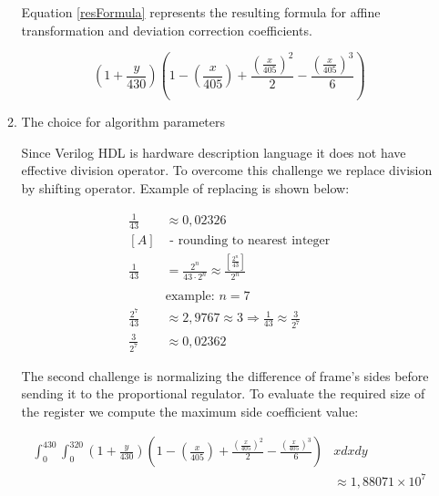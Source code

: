 \documentclass[a4paper,12pt]{article} %
\begin{document}
\begin{enumerate}
\begin{enumerate}
		Equation \eqref{resFormula} represents the resulting formula for affine transformation and deviation correction coefficients.

		\begin{equation}
			\left ( 1 + \frac{y}{430}\right )
			\left (  
			1 - \left ( \frac{x}{405}\right) + 
			\frac{\left ( \frac{x}{405}\right) ^2}{2}  -
			\frac{\left ( \frac{x}{405}\right)^3}{6}
			\right )
			\label{resFormula}
		\end{equation}
		\vspace{1cm}
		
		\item The choice for algorithm parameters
		
		Since Verilog HDL is hardware description language it does not have effective division operator. To overcome this challenge we replace division by shifting operator. Example of replacing is shown below:
		
 
		
		\begin{align*}
			\frac{1}{43} &\approx 0,02326 \\
			[A] &\text{ - rounding to nearest integer} \\
			\frac{1}{43} &= \frac{2^n}{43 \cdot 2^n} \approx \frac{\left [ \frac{2^n}{43} \right ]}{2^n} \\  \\
			&\text{example: } n = 7\\
			\frac{2^7}{43} &\approx 2,9767 \approx 3 \Rightarrow 
			\frac{1}{43} \approx \frac{3}{2^7} \\
			\frac{3}{2^7} &\approx 0,02362
		\end{align*}
		
		The second challenge is normalizing the difference of frame's sides before sending it to the proportional regulator. To evaluate the required size of the register we compute the maximum side coefficient value:
		
		
		\begin{equation}
		\begin{aligned}
			\int_0^{430} \int_0^{320} 
			\left ( 1 + \frac{y}{430}\right )
			\left (  
			1 - \left ( \frac{x}{405}\right) + 
			\frac{\left ( \frac{x}{405}\right) ^2}{2}  -
			\frac{\left ( \frac{x}{405}\right)^3}{6}
			\right )
			&x
			dx
			dy\\
			&\approx 1,88071 \times 10^7 
		\end{aligned}
		\end{equation}
		

\end{enumerate}
\end{enumerate}
\end{document}
